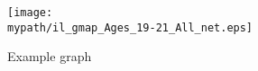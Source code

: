 \begin{figure}[htbp]
  \begin{center}
\centerline{\texttt{[image: \\mypath/il\_gmap\_Ages\_19-21\_All\_net.eps]}} 
    
    \caption{Example graph}
    \label{fig:figure_example}
  \end{center}
\end{figure}

